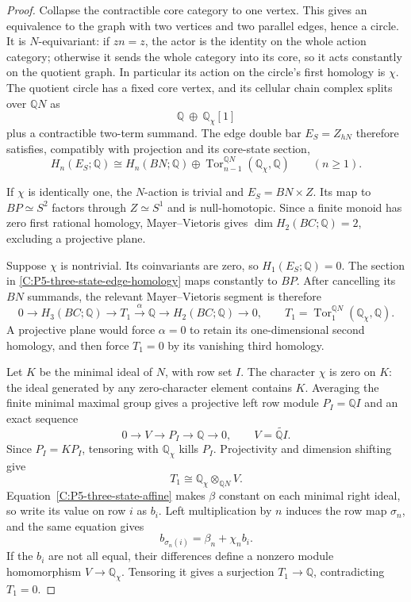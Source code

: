 \begin{proof}
Collapse the contractible core category to one vertex.  This
gives an equivalence to the graph with two vertices and two
parallel edges, hence a circle.  It is $N$-equivariant: if
$zn=z$, the actor is the identity on the whole action category;
otherwise it sends the whole category into its core, so it
acts constantly on the quotient graph.  In particular its
action on the circle's first homology is $\chi$.
The quotient circle has a fixed core vertex, and its cellular
chain complex splits over $\mathbb QN$ as
\[
 \mathbb Q\ \oplus\ \mathbb Q_\chi[1]
\]
plus a contractible two-term summand.  The edge double bar
$E_S=Z_{hN}$ therefore satisfies, compatibly with projection
and its core-state section,
\begin{equation}\label{C:P5-three-state-edge-homology}
 H_n(E_S;\mathbb Q)\cong H_n(BN;\mathbb Q)
       \oplus\operatorname{Tor}^{\mathbb QN}_{n-1}
                     (\mathbb Q_\chi,\mathbb Q)
 \qquad(n\geq1).
\end{equation}

If $\chi$ is identically one, the $N$-action is trivial and
$E_S=BN\times Z$.  Its map to $BP\simeq S^2$ factors through
$Z\simeq S^1$ and is null-homotopic.  Since a finite monoid
has zero first rational homology, Mayer--Vietoris gives
$\dim H_2(BC;\mathbb Q)=2$, excluding a projective plane.

Suppose $\chi$ is nontrivial.  Its coinvariants are zero, so
$H_1(E_S;\mathbb Q)=0$.  The section in
\eqref{C:P5-three-state-edge-homology} maps constantly to $BP$.
After cancelling its $BN$ summands, the relevant
Mayer--Vietoris segment is therefore
\[
 0\longrightarrow H_3(BC;\mathbb Q)
 \longrightarrow T_1\xrightarrow{\alpha}\mathbb Q
 \longrightarrow H_2(BC;\mathbb Q)\longrightarrow0,
 \qquad
 T_1=\operatorname{Tor}^{\mathbb QN}_1
                 (\mathbb Q_\chi,\mathbb Q).
\]
A projective plane would force $\alpha=0$ to retain its
one-dimensional second homology, and then force $T_1=0$
by its vanishing third homology.

Let $K$ be the minimal ideal of $N$, with row set $I$.
The character $\chi$ is zero on $K$: the ideal generated by
any zero-character element contains $K$.  Averaging the finite
minimal maximal group gives a projective left row module
$P_I=\mathbb QI$ and an exact sequence
\[
 0\longrightarrow V\longrightarrow P_I
   \longrightarrow\mathbb Q\longrightarrow0,
 \qquad V=\widetilde{\mathbb QI}.
\]
Since $P_I=KP_I$, tensoring with $\mathbb Q_\chi$ kills
$P_I$.  Projectivity and dimension shifting give
\[
 T_1\cong\mathbb Q_\chi\otimes_{\mathbb QN}V.
\]
Equation~\eqref{C:P5-three-state-affine} makes $\beta$ constant
on each minimal right ideal, so write its value on row $i$
as $b_i$.  Left multiplication by $n$ induces the row map
$\sigma_n$, and the same equation gives
\[
 b_{\sigma_n(i)}=\beta_n+\chi_n b_i.
\]
If the $b_i$ are not all equal, their differences define a
nonzero module homomorphism
$V\to\mathbb Q_\chi$.  Tensoring it gives a surjection
$T_1\to\mathbb Q$, contradicting $T_1=0$.


\end{proof}
